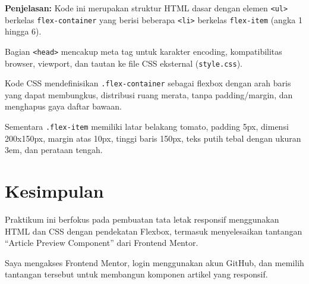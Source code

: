 \documentclass[a4paper,oneside,12pt]{book}
\begin{document}
\textbf{Penjelasan:} Kode ini merupakan struktur HTML dasar dengan elemen \texttt{<ul>} berkelas \texttt{flex-container} yang berisi beberapa \texttt{<li>} berkelas \texttt{flex-item} (angka 1 hingga 6). 



Bagian \texttt{<head>} mencakup meta tag untuk karakter encoding, kompatibilitas browser, viewport, dan tautan ke file CSS eksternal (\texttt{style.css}). 



Kode CSS mendefinisikan \texttt{.flex-container} sebagai flexbox dengan arah baris yang dapat membungkus, distribusi ruang merata, tanpa padding/margin, dan menghapus gaya daftar bawaan. 



Sementara \texttt{.flex-item} memiliki latar belakang tomato, padding 5px, dimensi 200x150px, margin atas 10px, tinggi baris 150px, teks putih tebal dengan ukuran 3em, dan perataan tengah.



\chapter*{Kesimpulan}
\setcounter{chapter}{4}
\setcounter{section}{0}
Praktikum ini berfokus pada pembuatan tata letak responsif menggunakan HTML dan CSS dengan pendekatan Flexbox, termasuk menyelesaikan tantangan ``Article Preview Component'' dari Frontend Mentor. 



Saya mengakses Frontend Mentor, login menggunakan akun GitHub, dan memilih tantangan tersebut untuk membangun komponen artikel yang responsif.

\newpage
{}
\end{document}
